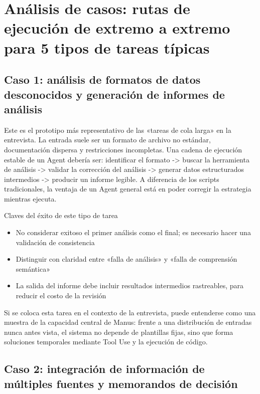 \section{Análisis de casos: rutas de ejecución de extremo a extremo para 5 tipos de tareas típicas}

\subsection{Caso 1: análisis de formatos de datos desconocidos y generación de informes de análisis}

Este es el prototipo más representativo de las «tareas de cola larga» en la entrevista. La entrada suele ser un formato de archivo no estándar, documentación dispersa y restricciones incompletas. Una cadena de ejecución estable de un Agent debería ser: identificar el formato -> buscar la herramienta de análisis -> validar la corrección del análisis -> generar datos estructurados intermedios -> producir un informe legible. A diferencia de los scripts tradicionales, la ventaja de un Agent general está en poder corregir la estrategia mientras ejecuta.

\begin{importantbox}{Claves del éxito de este tipo de tarea}
\begin{itemize}
    \item No considerar exitoso el primer análisis como el final; es necesario hacer una validación de consistencia
    \item Distinguir con claridad entre «falla de análisis» y «falla de comprensión semántica»
    \item La salida del informe debe incluir resultados intermedios rastreables, para reducir el costo de la revisión
\end{itemize}
\end{importantbox}

Si se coloca esta tarea en el contexto de la entrevista, puede entenderse como una muestra de la capacidad central de Manus: frente a una distribución de entradas nunca antes vista, el sistema no depende de plantillas fijas, sino que forma soluciones temporales mediante Tool Use y la ejecución de código.

\subsection{Caso 2: integración de información de múltiples fuentes y memorandos de decisión}

